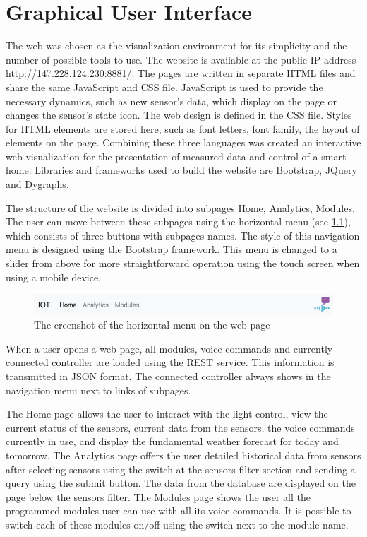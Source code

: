 \chapter{Graphical User Interface} \label{chap:GUI}

The web was chosen as the visualization environment for its simplicity and the number of possible tools to use. The website is available at the public IP address http://147.228.124.230:8881/. The pages are written in separate HTML files and share the same JavaScript and CSS file. JavaScript is used to provide the necessary dynamics, such as new sensor's data, which display on the page or changes the sensor's state icon. The web design is defined in the CSS file. Styles for HTML elements are stored here, such as font letters, font family, the layout of elements on the page. Combining these three languages was created an interactive web visualization for the presentation of measured data and control of a smart home. Libraries and frameworks used to build the website are Bootstrap, JQuery and Dygraphs.

The structure of the website is divided into subpages Home, Analytics, Modules. The user can move between these subpages using the horizontal menu (see \cref{fig:screenshot_menu}), which consists of three buttons with subpages names. The style of this navigation menu is designed using the Bootstrap framework. This menu is changed to a slider from above for more straightforward operation using the touch screen when using a mobile device.

\begin{figure}[H]
    \centering
    \includegraphics[width=\textwidth]{img/screenshot_menu.png}
    \caption{The creenshot of the horizontal menu on the web page}
    \label{fig:screenshot_menu}
\end{figure}

When a user opens a web page, all modules, voice commands and currently connected controller are loaded using the REST service. This information is transmitted in JSON format. The connected controller always shows in the navigation menu next to links of subpages.

The Home page allows the user to interact with the light control, view the current status of the sensors, current data from the sensors, the voice commands currently in use, and display the fundamental weather forecast for today and tomorrow. The Analytics page offers the user detailed historical data from sensors after selecting sensors using the switch at the sensors filter section and sending a query using the submit button. The data from the database are displayed on the page below the sensors filter. The Modules page shows the user all the programmed modules user can use with all its voice commands. It is possible to switch each of these modules on/off using the switch next to the module name.

